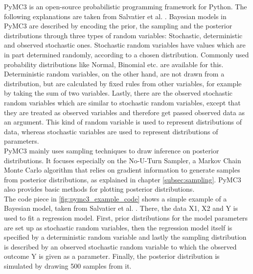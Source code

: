 \documentclass{article}
\begin{document}
PyMC3 is an open-source probabilistic programming framework for Python. The following explanations are taken from Salvatier et al. \cite{Salvatier2016}. Bayesian models in PyMC3 are described by encoding the prior, the sampling and the posterior distributions through three types of random variables: Stochastic, deterministic and observed stochastic ones. Stochastic random variables have values which are in part determined randomly, according to a chosen distribution. Commonly used probability distributions like Normal, Binomial etc. are available for this. Deterministic random variables, on the other hand, are not drawn from a distribution, but are calculated by fixed rules from other variables, for example by taking the sum of two variables. Lastly, there are the observed stochastic random variables which are similar to stochastic random variables, except that they are treated as observed variables and therefore get passed observed data as an argument. This kind of random variable is used to represent distributions of data, whereas stochastic variables are used to represent distributions of parameters.
\\
PyMC3 mainly uses sampling techniques to draw inference on posterior distributions. It focuses especially on the No-U-Turn Sampler, a Markov Chain Monte Carlo algorithm that relies on gradient information to generate samples from posterior distributions, as explained in chapter \ref{subsec:sampling}. PyMC3 also provides basic methods for plotting posterior distributions.
\\
The code piece  in \ref{fig:pymc3_example_code} shows a simple example of a Bayesian model, taken from Salvatier et al. \cite{Salvatier2016}. There, the data X1, X2 and Y is used to fit a regression model. First, prior distributions for the model parameters are set up as stochastic random variables, then the regression model itself is specified by a deterministic random variable and lastly the sampling distribution is described by an observed stochastic random variable to which the observed outcome Y is given as a parameter. Finally, the posterior distribution is simulated by drawing 500 samples from it.
\end{document}
